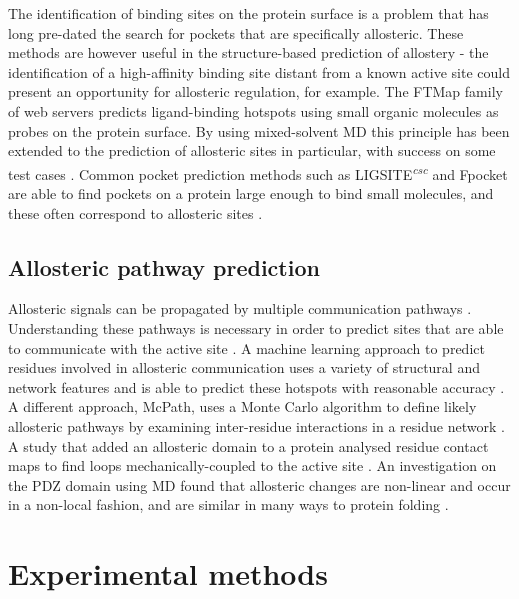 The identification of binding sites on the protein surface is a problem that has long pre-dated the search for pockets that are specifically allosteric.
These methods are however useful in the structure-based prediction of allostery - the identification of a high-affinity binding site distant from a known active site could present an opportunity for allosteric regulation, for example.
The FTMap family of web servers \cite{Kozakov2015} predicts ligand-binding hotspots using small organic molecules as probes on the protein surface.
By using mixed-solvent MD this principle has been extended to the prediction of allosteric sites in particular, with success on some test cases \cite{Ghanakota2016}.
Common pocket prediction methods such as LIGSITE\textsuperscript{\it csc} \cite{Huang2006} and Fpocket \cite{LeGuilloux2009} are able to find pockets on a protein large enough to bind small molecules, and these often correspond to allosteric sites \cite{Greener2017}.

\subsection{Allosteric pathway prediction}

Allosteric signals can be propagated by multiple communication pathways \cite{DelSol2009}.
Understanding these pathways is necessary in order to predict sites that are able to communicate with the active site \cite{Dokholyan2016}.
A machine learning approach to predict residues involved in allosteric communication uses a variety of structural and network features and is able to predict these hotspots with reasonable accuracy \cite{Demerdash2009}.
A different approach, McPath, uses a Monte Carlo algorithm to define likely allosteric pathways by examining inter-residue interactions in a residue network \cite{Kaya2013}.
A study that added an allosteric domain to a protein analysed residue contact maps to find loops mechanically-coupled to the active site \cite{Dagliyan2016}.
An investigation on the PDZ domain using MD found that allosteric changes are non-linear and occur in a non-local fashion, and are similar in many ways to protein folding \cite{Buchenberg2017}.

\section{Experimental methods}

